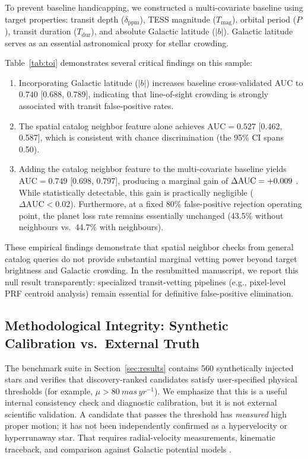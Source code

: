 \documentclass[preprint,12pt,authoryear]{elsarticle}
\begin{document}
To prevent baseline handicapping, we constructed a multi-covariate baseline using target properties: transit depth ($\delta_{\mathrm{ppm}}$), TESS magnitude ($T_{\mathrm{mag}}$), orbital period ($P$), transit duration ($T_{\mathrm{dur}}$), and absolute Galactic latitude ($|b|$). Galactic latitude serves as an essential astronomical proxy for stellar crowding.



Table~\ref{tab:toi} demonstrates several critical findings on this sample:
\begin{enumerate}
    \item Incorporating Galactic latitude ($|b|$) increases baseline cross-validated AUC to $0.740$ [0.688, 0.789], indicating that line-of-sight crowding is strongly associated with transit false-positive rates.
    \item The spatial catalog neighbor feature alone achieves $\text{AUC} = 0.527$ [0.462, 0.587], which is consistent with chance discrimination (the 95\% CI spans 0.50).
    \item Adding the catalog neighbor feature to the multi-covariate baseline yields $\text{AUC} = 0.749$ [0.698, 0.797], producing a marginal gain of $\Delta\text{AUC} = +0.009{}$ \toiDeltaCI{}. While statistically detectable, this gain is practically negligible ($\Delta\text{AUC} < 0.02$). Furthermore, at a fixed 80\% false-positive rejection operating point, the planet loss rate remains essentially unchanged (43.5\% without neighbours vs.\ 44.7\% with neighbours).
\end{enumerate}

These empirical findings demonstrate that spatial neighbor checks from general catalog queries do not provide substantial marginal vetting power beyond target brightness and Galactic crowding. In the resubmitted manuscript, we report this null result transparently: specialized transit-vetting pipelines (e.g., pixel-level PRF centroid analysis) remain essential for definitive false-positive elimination.

\subsection{Methodological Integrity: Synthetic Calibration vs.\ External Truth}
\label{sec:synthetic}

The benchmark suite in Section~\ref{sec:results} contains 560 synthetically injected stars and verifies that discovery-ranked candidates satisfy user-specified physical thresholds (for example, $\mu > \SI{80}{mas\,yr^{-1}}$). We emphasize that this is a useful internal consistency check and diagnostic calibration, but it is not external scientific validation. A candidate that passes the threshold has \emph{measured} high proper motion; it has not been independently confirmed as a hypervelocity or hyperrunaway star. That requires radial-velocity measurements, kinematic traceback, and comparison against Galactic potential models \citep{Brown2015, ElBadry2021}. 
\end{document}
